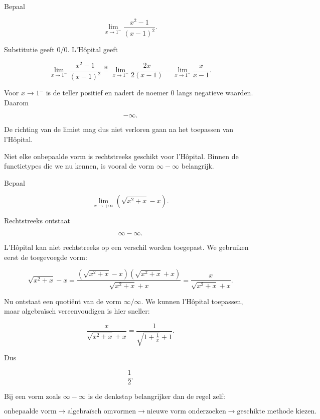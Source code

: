 \documentclass{ximera}
\begin{document}
\begin{voorbeeld}
Bepaal

\[\lim_{x\to1^-}\frac{x^2-1}{(x-1)^2}.\]

Substitutie geeft \(0/0\). L'Hôpital geeft

\[
\lim_{x\to1^-}\frac{x^2-1}{(x-1)^2}
\overset{\mathrm H}{=}
\lim_{x\to1^-}\frac{2x}{2(x-1)}
=
\lim_{x\to1^-}\frac{x}{x-1}.
\]

Voor \(x\to1^-\) is de teller positief en nadert de noemer \(0\) langs
negatieve waarden. Daarom

\[\boxed{-\infty}.\]

De richting van de limiet mag dus niet verloren gaan na het toepassen van
l'Hôpital.
\end{voorbeeld}



Niet elke onbepaalde vorm is rechtstreeks geschikt voor l'Hôpital.
Binnen de functietypes die we nu kennen, is vooral de vorm
\(\infty-\infty\) belangrijk.

\begin{voorbeeld}
Bepaal

\[\lim_{x\to+\infty}\left(\sqrt{x^2+x}-x\right).\]

Rechtstreeks ontstaat

\[\infty-\infty.\]

L'Hôpital kan niet rechtstreeks op een verschil worden toegepast.
We gebruiken eerst de toegevoegde vorm:

\[
\sqrt{x^2+x}-x
=
\frac{(\sqrt{x^2+x}-x)(\sqrt{x^2+x}+x)}
{\sqrt{x^2+x}+x}
=
\frac{x}{\sqrt{x^2+x}+x}.
\]

Nu ontstaat een quotiënt van de vorm \(\infty/\infty\). We kunnen
l'Hôpital toepassen, maar algebraïsch vereenvoudigen is hier sneller:

\[
\frac{x}{\sqrt{x^2+x}+x}
=
\frac{1}{\sqrt{1+\frac1x}+1}.
\]

Dus

\[\boxed{\frac12}.\]
\end{voorbeeld}

\begin{opmerking}
Bij een vorm zoals \(\infty-\infty\) is de denkstap belangrijker dan de
regel zelf:

\[
\text{onbepaalde vorm}
\longrightarrow
\text{algebraïsch omvormen}
\longrightarrow
\text{nieuwe vorm onderzoeken}
\longrightarrow
\text{geschikte methode kiezen}.
\]
\end{opmerking}
\end{document}
